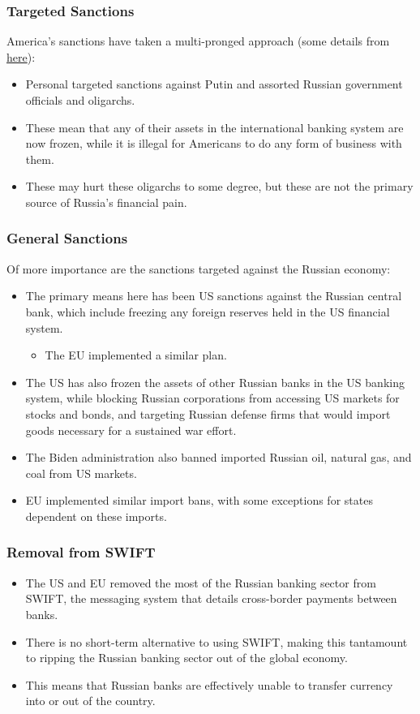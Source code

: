 \documentclass{beamer}
\begin{document}
\begin{frame} 
	\frametitle{\LARGE{Targeted Sanctions}}
	America's sanctions have taken a multi-pronged approach (some details from \href{https://www.vox.com/22968949/russia-sanctions-swift-economy-mcdonalds}{here}):
	\begin{itemize}
		\item Personal targeted sanctions against Putin and assorted Russian government officials and oligarchs. \pause
		\item These mean that any of their assets in the international banking system are now frozen, while it is illegal for Americans to do any form of business with them.
		\item These may hurt these oligarchs to some degree, but these are not the primary source of Russia's financial pain.
	\end{itemize}
\end{frame}

\begin{frame} 
	\frametitle{\LARGE{General Sanctions}}
	Of more importance are the sanctions targeted against the Russian economy:
	\begin{itemize}
		\item The primary means here has been US sanctions against the Russian central bank, which include freezing any foreign reserves held in the US financial system.
		\begin{itemize}
			\item The EU implemented a similar plan. \pause
		\end{itemize}
		\item The US has also frozen the assets of other Russian banks in the US banking system, while blocking Russian corporations from accessing US markets for stocks and bonds, and targeting Russian defense firms that would import goods necessary for a sustained war effort. \pause
		\item The Biden administration also banned imported Russian oil, natural gas, and coal from US markets. \pause
		\item EU implemented similar import bans, with some exceptions for states dependent on these imports.
	\end{itemize}
\end{frame}

\begin{frame} 
	\frametitle{\LARGE{Removal from SWIFT}}
	\begin{itemize}
		\item The US and EU removed the most of the Russian banking sector from SWIFT, the messaging system that details cross-border payments between banks. \pause
		\item There is no short-term alternative to using SWIFT, making this tantamount to ripping the Russian banking sector out of the global economy.
		\item This means that Russian banks are effectively unable to transfer currency into or out of the country.
	\end{itemize}
\end{frame}
\end{document}
